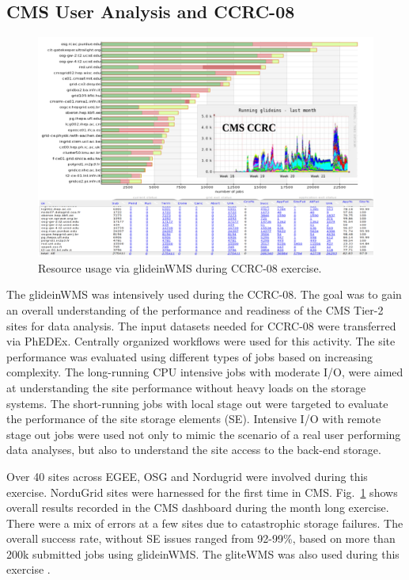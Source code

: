 \documentclass[a4paper]{jpconf}
\begin{document}
\subsection{CMS User Analysis and CCRC-08}
\begin{figure}
\begin{center}
\includegraphics[scale=0.55]{glideins_ccrc08}
\end{center}
\caption{Resource usage via glideinWMS during CCRC-08 exercise.}
\label{fig:glideins_ccrc}
\end{figure}
The glideinWMS was intensively used during the CCRC-08. The goal was to gain an overall understanding 
of the performance and readiness of the CMS Tier-2 sites for data analysis. The input datasets needed for CCRC-08 were transferred
via PhEDEx. Centrally organized workflows were used for this activity. The site performance
was evaluated using different types of jobs based on increasing complexity. The long-running 
CPU intensive jobs with moderate I/O, were aimed at understanding the site performance without
heavy loads on the storage systems. The short-running jobs with local stage out were targeted
to evaluate the performance of the site storage elements (SE). Intensive I/O with remote stage out
jobs were used not only to mimic the scenario of a real user performing data analyses, but also
to understand the site access to the back-end storage.

Over 40 sites across EGEE, OSG and Nordugrid were involved during this exercise. NorduGrid sites 
were harnessed for the first time in CMS. Fig.~\ref{fig:glideins_ccrc} shows overall results recorded in the CMS dashboard 
during the month long exercise. There were a mix of errors at a few sites due to catastrophic storage 
failures. The overall success rate, without SE issues ranged from 92-99\%, based on more than 200k 
submitted jobs using glideinWMS. The gliteWMS was also used during this exercise \cite{bib:cms_glite}.
\end{document}
